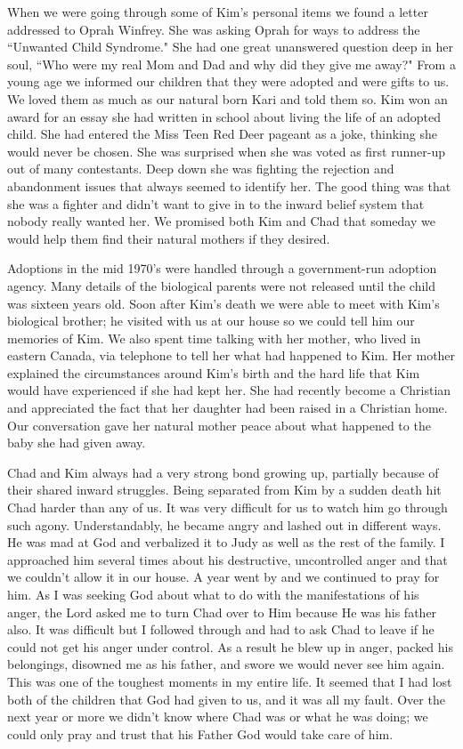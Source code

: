 \documentclass[oneside]{book}
\begin{document}
When we were going through some of Kim's personal items we found a letter addressed to Oprah Winfrey. She was asking Oprah for ways to address the ``Unwanted Child Syndrome." She had one great unanswered question deep in her soul, ``Who were my real Mom and Dad and why did they give me away?" From a young age we informed our children that they were adopted and were gifts to us. We loved them as much as our natural born Kari and told them so. Kim won an award for an essay she had written in school about living the life of an adopted child. She had entered the Miss Teen Red Deer pageant as a joke, thinking she would never be chosen. She was surprised when she was voted as first runner-up out of many contestants. Deep down she was fighting the rejection and abandonment issues that always seemed to identify her. The good thing was that she was a fighter and didn't want to give in to the inward belief system that nobody really wanted her. We promised both Kim and Chad that someday we would help them find their natural mothers if they desired. 

Adoptions in the mid 1970's were handled through a government-run adoption agency. Many details of the biological parents were not released until the child was sixteen years old. Soon after Kim's death we were able to meet with Kim's biological brother; he visited with us at our house so we could tell him our memories of Kim. We also spent time talking with her mother, who lived in eastern Canada, via telephone to tell her what had happened to Kim. Her mother explained the circumstances around Kim's birth and the hard life that Kim would have experienced if she had kept her. She had recently become a Christian and appreciated the fact that her daughter had been raised in a Christian home. Our conversation gave her natural mother peace about what happened to the baby she had given away.

Chad and Kim always had a very strong bond growing up, partially because of their shared inward struggles. Being separated from Kim by a sudden death hit Chad harder than any of us. It was very difficult for us to watch him go through such agony. Understandably, he became angry and lashed out in different ways. He was mad at God and verbalized it to Judy as well as the rest of the family. I approached him several times about his destructive, uncontrolled anger and that we couldn't allow it in our house.  A year went by and we continued to pray for him. As I was seeking God about what to do with the manifestations of his anger, the Lord asked me to turn Chad over to Him because He was his father also. It was difficult but I followed through and had to ask Chad to leave if he could not get his anger under control. As a result he blew up in anger, packed his belongings, disowned me as his father, and swore we would never see him again. This was one of the toughest moments in my entire life. It seemed that I had lost both of the children that God had given to us, and it was all my fault.  Over the next year or more we didn't know where Chad was or what he was doing; we could only pray and trust that his Father God would take care of him.
\end{document}
